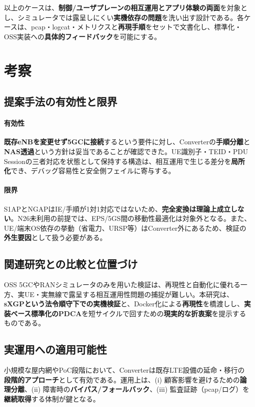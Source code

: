 以上のケースは、\textbf{制御/ユーザプレーンの相互運用とアプリ体験の両面}を対象とし、シミュレータでは露呈しにくい\textbf{実機依存の問題}を洗い出す設計である。各ケースは、pcap・logcat・メトリクスと\textbf{再現手順}をセットで文書化し、標準化・OSS実装への\textbf{具体的フィードバック}を可能にする。

\section{考察}
\subsection{提案手法の有効性と限界}
\paragraph{有効性} \textbf{既存eNBを変更せず5GCに接続}するという要件に対し、Converterの\textbf{手順分離}と\textbf{NAS透過}という方針は妥当であることが確認できた。UE識別子・TEID・PDU Sessionの三者対応を状態として保持する構造は、相互運用で生じる差分を\textbf{局所化}でき、デバッグ容易性と安全側フェイルに寄与する。
\paragraph{限界} S1APとNGAPはIE/手順が1対1対応ではないため、\textbf{完全変換は理論上成立しない}。N26未利用の前提では、EPS/5GS間の移動性最適化は対象外となる。また、UE/端末OS依存の挙動（省電力、URSP等）はConverter外にあるため、検証の\textbf{外生要因}として扱う必要がある。

\subsection{関連研究との比較と位置づけ}
OSS 5GCやRANシミュレータのみを用いた検証は、再現性と自動化に優れる一方、実UE・実無線で露呈する相互運用性問題の捕捉が難しい。本研究は、\textbf{sXGPという法令順守下での実機検証}と、Docker化による\textbf{再現性}を橋渡しし、\textbf{実装ベース標準化のPDCA}を短サイクルで回すための\textbf{現実的な折衷案}を提示するものである。

\subsection{実運用への適用可能性}
小規模な屋内網やPoC段階において、Converterは既存LTE設備の延命・移行の\textbf{段階的アプローチ}として有効である。運用上は、(i) 顧客影響を避けるための\textbf{論理分離}、(ii) 障害時の\textbf{バイパス/フォールバック}、(iii) 監査証跡（pcap/ログ）を\textbf{継続取得}する体制が鍵となる。

